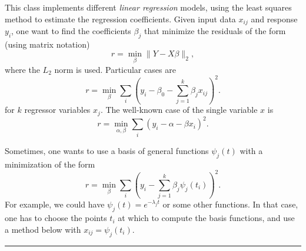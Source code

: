 
This class implements different \emph{linear regression} models, using the
least squares method to estimate the regression coefficients. Given
input data $x_{ij}$ and response $y_i$, one want to find the
coefficients $\beta_j$ that minimize the residuals of the form
(using matrix notation)
%
\[
r = \min_\beta \|Y - X\beta\|_2,
\]
%
where the $L_2$ norm is used. Particular cases are
\[
 r = \min_\beta \sum_i \left(y_i - \beta_0 - \sum_{j=1}^k \beta_j x_{ij}\right)^2.
\]
%
for $k$ regressor variables $x_j$. The well-known case of the single
variable $x$ is
\[
  r = \min_{\alpha,\beta} \sum_i \left(y_i - \alpha - \beta x_{i}\right)^2.
\]
%

Sometimes, one wants to use a basis of general functions $\psi_j(t)$
with a minimization of the form
\[
r = \min_\beta  \sum_i \left(y_i - \sum_{j=1}^k \beta_j\psi_j(t_{i})\right)^2.
\]
For example, we could have $\psi_j(t) = e^{-\lambda_j t}$ or some other
functions.
In that case, one has to choose the points $t_i$ at which to
compute the basis functions, and use a method below with
$x_{ij} = \psi_j(t_{i})$.

\bigskip\hrule

